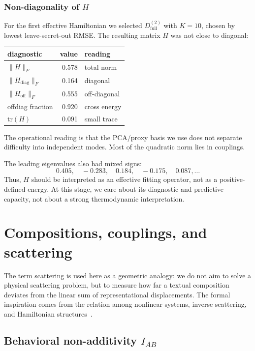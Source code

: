 \documentclass[10pt,twocolumn]{article}
\begin{document}
\subsubsection*{Non-diagonality of \texorpdfstring{\(H\)}{H}}

For the first effective Hamiltonian we selected \(D^{(2)}_{\mathrm{full}}\) with \(K=10\), chosen by lowest leave-secret-out RMSE. The resulting matrix \(H\) was not close to diagonal:

\begin{center}
\scriptsize
\begin{tabular}{@{}lrl@{}}
\toprule
diagnostic & value & reading \\
\midrule
\(\|H\|_F\) & 0.578 & total norm \\
\(\|H_{\mathrm{diag}}\|_F\) & 0.164 & diagonal \\
\(\|H_{\mathrm{off}}\|_F\) & 0.555 & off-diagonal \\
offdiag fraction & 0.920 & cross energy \\
\(\mathrm{tr}(H)\) & 0.091 & small trace \\
\bottomrule
\end{tabular}
\end{center}

The operational reading is that the PCA/proxy basis we use does not separate difficulty into independent modes. Most of the quadratic norm lies in couplings.

The leading eigenvalues also had mixed signs:
\[
0.405,\quad -0.283,\quad 0.184,\quad -0.175,\quad 0.087,\ldots
\]
Thus, \(H\) should be interpreted as an effective fitting operator, not as a positive-defined energy. At this stage, we care about its diagnostic and predictive capacity, not about a strong thermodynamic interpretation.

\section{Compositions, couplings, and scattering}

The term scattering is used here as a geometric analogy: we do not aim to solve a physical scattering problem, but to measure how far a textual composition deviates from the linear sum of representational displacements. The formal inspiration comes from the relation among nonlinear systems, inverse scattering, and Hamiltonian structures~\cite{zakharov1972exact,faddeev2007hamiltonian}.

\subsection{Behavioral non-additivity \texorpdfstring{\(I_{AB}\)}{IAB}}
\end{document}
